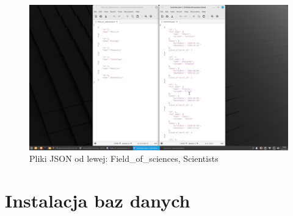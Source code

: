 \documentclass[11pt]{article}
\begin{document}
\newpage
		\begin{figure}[h]
			\includegraphics[width=\textwidth]{JSON_examples_2.png}
			\caption{Pliki JSON od lewej: Field\_of\_sciences, Scientists}
		\end{figure}
\section{Instalacja baz danych}
\end{document}
